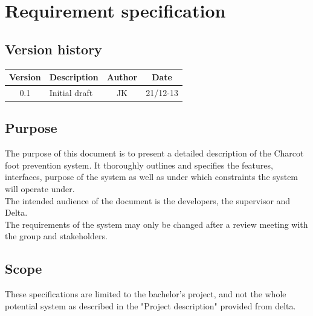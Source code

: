 



\chapter{Requirement specification}

\section{Version history}
\begin{table}[H]
\begin{tabular}{|c|p{9cm}|c|c|}
\hline
Version & Description & Author & Date\\
\hline
0.1 & Initial draft & JK & 21/12-13\\
\hline
\end{tabular}
\end{table}

\section{Purpose}
The purpose of this document is to present a detailed description of the Charcot foot prevention system. It thoroughly outlines and specifies the features, interfaces, purpose of the system as well as under which constraints the system will operate under.\\
The intended audience of the document is the developers, the supervisor and Delta.\\
The requirements of the system may only be changed after a review meeting with the group and stakeholders.\\

\section{Scope}
These specifications are limited to the bachelor's project, and not the whole potential system as described in the "Project description" provided from delta.\\

